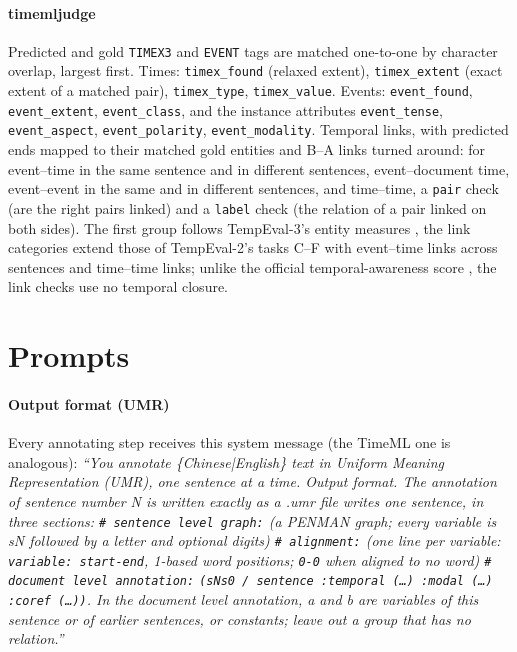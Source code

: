 \paragraph{timemljudge} Predicted and gold \texttt{TIMEX3} and \texttt{EVENT} tags are matched one-to-one by character overlap, largest first. Times: \texttt{timex\_found} (relaxed extent), \texttt{timex\_extent} (exact extent of a matched pair), \texttt{timex\_type}, \texttt{timex\_value}. Events: \texttt{event\_found}, \texttt{event\_extent}, \texttt{event\_class}, and the instance attributes \texttt{event\_tense}, \texttt{event\_aspect}, \texttt{event\_polarity}, \texttt{event\_modality}. Temporal links, with predicted ends mapped to their matched gold entities and B--A links turned around: for event--time in the same sentence and in different sentences, event--document time, event--event in the same and in different sentences, and time--time, a \texttt{pair} check (are the right pairs linked) and a \texttt{label} check (the relation of a pair linked on both sides). The first group follows TempEval-3's entity measures \citep{uzzaman2013semeval}, the link categories extend those of TempEval-2's tasks C--F \citep{verhagen2010semeval} with event--time links across sentences and time--time links; unlike the official temporal-awareness score \citep{uzzaman2011temporal}, the link checks use no temporal closure.

\section{Prompts}
\label{app:prompts}

\paragraph{Output format (UMR)} Every annotating step receives this system message (the TimeML one is analogous): \emph{``You annotate \{Chinese|English\} text in Uniform Meaning Representation (UMR), one sentence at a time. Output format. The annotation of sentence number N is written exactly as a .umr file writes one sentence, in three sections: \texttt{\# sentence level graph:} (a PENMAN graph; every variable is sN followed by a letter and optional digits) \texttt{\# alignment:} (one line per variable: \texttt{variable: start-end}, 1-based word positions; \texttt{0-0} when aligned to no word) \texttt{\# document level annotation:} \texttt{(sNs0 / sentence :temporal (\ldots) :modal (\ldots) :coref (\ldots))}. In the document level annotation, a and b are variables of this sentence or of earlier sentences, or constants; leave out a group that has no relation.''}

